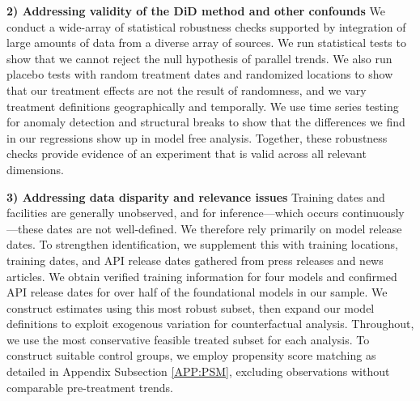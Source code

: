 \documentclass[a4paper,fleqn,longmktitle]{cas-sc}
\newcommand{\nb}[1]{\textcolor{blue}{NB[#1]}}
\newcommand{\aruna}[1]{\textcolor{blue}{Aruna[#1]}}
\theoremstyle{plain}
\theoremstyle{definition}
\begin{document}
\noindent\textbf{2) Addressing validity of the DiD method and other confounds} We conduct a wide-array of statistical robustness checks supported by integration of large amounts of data from a diverse array of sources. We run statistical tests to show that we cannot reject the null hypothesis of parallel trends. We also run placebo tests with random treatment dates and randomized locations to show that our treatment effects are not the result of randomness, and we vary treatment definitions geographically and temporally. We use time series testing for anomaly detection and structural breaks to show that the differences we find in our regressions show up in model free analysis. Together, these robustness checks provide evidence of an experiment that is valid across all relevant dimensions.

\noindent\textbf{3) Addressing data disparity and relevance issues} 
Training dates and facilities are generally unobserved, and for inference—which occurs continuously—these dates are not well-defined. We therefore rely primarily on model release dates. To strengthen identification, we supplement this with training locations, training dates, and API release dates gathered from press releases and news articles. We obtain verified training information for four models and confirmed API release dates for over half of the foundational models in our sample. We construct estimates using this most robust subset, then expand our model definitions to exploit exogenous variation for counterfactual analysis. Throughout, we use the most conservative feasible treated subset for each analysis. To construct suitable control groups, we employ propensity score matching as detailed in Appendix Subsection \ref{APP:PSM}, excluding observations without comparable pre-treatment trends.

\end{document}
